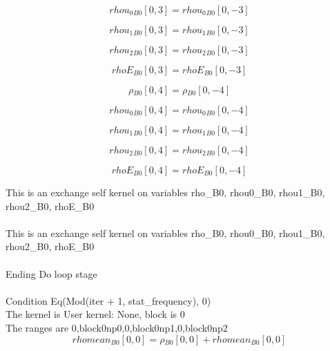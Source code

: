\documentclass{article}
\begin{document}
\begin{dmath}{rhou_{0}{_{B0}}}[{0,3}] = {rhou_{0}{_{B0}}}[{0,-3}]\end{dmath}

\begin{dmath}{rhou_{1}{_{B0}}}[{0,3}] = {rhou_{1}{_{B0}}}[{0,-3}]\end{dmath}

\begin{dmath}{rhou_{2}{_{B0}}}[{0,3}] = {rhou_{2}{_{B0}}}[{0,-3}]\end{dmath}

\begin{dmath}{rhoE{_{B0}}}[{0,3}] = {rhoE{_{B0}}}[{0,-3}]\end{dmath}

\begin{dmath}{\rho{_{B0}}}[{0,4}] = {\rho{_{B0}}}[{0,-4}]\end{dmath}

\begin{dmath}{rhou_{0}{_{B0}}}[{0,4}] = {rhou_{0}{_{B0}}}[{0,-4}]\end{dmath}

\begin{dmath}{rhou_{1}{_{B0}}}[{0,4}] = {rhou_{1}{_{B0}}}[{0,-4}]\end{dmath}

\begin{dmath}{rhou_{2}{_{B0}}}[{0,4}] = {rhou_{2}{_{B0}}}[{0,-4}]\end{dmath}

\begin{dmath}{rhoE{_{B0}}}[{0,4}] = {rhoE{_{B0}}}[{0,-4}]\end{dmath}

\noindent This is an exchange self kernel on variables rho_B0, rhou0_B0, rhou1_B0, rhou2_B0, rhoE_B0\\\\\noindent This is an exchange self kernel on variables rho_B0, rhou0_B0, rhou1_B0, rhou2_B0, rhoE_B0\\\\\noindent Ending Do loop stage\\
\\\noindent Condition Eq(Mod(iter + 1, stat_frequency), 0)\\\noindent The kernel is User kernel: None, block is 0\\\noindent The ranges are 0,block0np0,0,block0np1,0,block0np2\\\begin{dmath}{rhomean{_{B0}}}[{0,0}] = {\rho{_{B0}}}[{0,0}] + {rhomean{_{B0}}}[{0,0}]\end{dmath}
\end{document}
